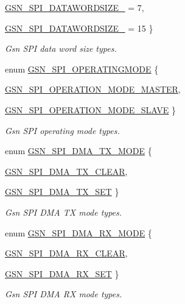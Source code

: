 \begin{DoxyCompactItemize}
\hyperlink{a00655_gga52e3e63232981dd9e13226ef140541bfa1e0f6a3003be36a5ace865cee8d34085}{GSN\_\-SPI\_\-DATAWORDSIZE\_} =  7, 
\par
\hyperlink{a00655_gga52e3e63232981dd9e13226ef140541bfa22e72ad895b04d78a53fa2ffba6baa57}{GSN\_\-SPI\_\-DATAWORDSIZE\_} =  15
 \}
\begin{DoxyCompactList}\small\item\em Gsn SPI data word size types. \end{DoxyCompactList}\item 
enum \hyperlink{a00655_ga4b04f6b757fd4a767ea05de3de79ad15}{GSN\_\-SPI\_\-OPERATINGMODE} \{ \par
\hyperlink{a00655_gga4b04f6b757fd4a767ea05de3de79ad15a41b20334a403fa4cba3f0516de08f358}{GSN\_\-SPI\_\-OPERATION\_\-MODE\_\-MASTER}, 
\par
\hyperlink{a00655_gga4b04f6b757fd4a767ea05de3de79ad15a3d789e465d2d8f6bfbe8664060babd5c}{GSN\_\-SPI\_\-OPERATION\_\-MODE\_\-SLAVE}
 \}
\begin{DoxyCompactList}\small\item\em Gsn SPI operating mode types. \end{DoxyCompactList}\item 
enum \hyperlink{a00655_gaf480fa60c7e6a9f132d47f0630a61b1a}{GSN\_\-SPI\_\-DMA\_\-TX\_\-MODE} \{ \par
\hyperlink{a00655_ggaf480fa60c7e6a9f132d47f0630a61b1aa1919ee7b81554032a841319c68fc9f22}{GSN\_\-SPI\_\-DMA\_\-TX\_\-CLEAR}, 
\par
\hyperlink{a00655_ggaf480fa60c7e6a9f132d47f0630a61b1aa7fad9b3d0348202826cd2d4b441ccc61}{GSN\_\-SPI\_\-DMA\_\-TX\_\-SET}
 \}
\begin{DoxyCompactList}\small\item\em Gsn SPI DMA TX mode types. \end{DoxyCompactList}\item 
enum \hyperlink{a00655_ga21afd388959dd6b6c022109aa9a42586}{GSN\_\-SPI\_\-DMA\_\-RX\_\-MODE} \{ \par
\hyperlink{a00655_gga21afd388959dd6b6c022109aa9a42586ad73b5edf1fdca2408d5e01fd1653919e}{GSN\_\-SPI\_\-DMA\_\-RX\_\-CLEAR}, 
\par
\hyperlink{a00655_gga21afd388959dd6b6c022109aa9a42586a805ddceba5549edcca5ea80a4ad36319}{GSN\_\-SPI\_\-DMA\_\-RX\_\-SET}
 \}
\begin{DoxyCompactList}\small\item\em Gsn SPI DMA RX mode types. \end{DoxyCompactList}\item 

\end{DoxyCompactItemize}
